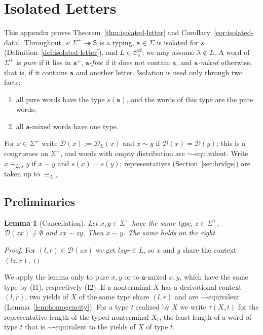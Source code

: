 \documentclass[11pt]{article}
\numberwithin{equation}{section}
\theoremstyle{plain}
\newtheorem{lemma}[theorem]{Lemma}
\theoremstyle{definition}
\theoremstyle{remark}
\theoremstyle{plain}
\newcommand{\cf}{\mathrm{cf}}
\newcommand{\Ccf}[1]{\mathcal C_{#1}^{\cf}}
\newcommand{\D}{\mathcal{D}}
\newcommand{\eps}{\lambda}
\begin{document}
\section{Isolated Letters}
\label{app:isolated}

This appendix proves Theorem~\ref{thm:isolated-letter} and
Corollary~\ref{cor:isolated-data}.  Throughout,
$s:\Sigma^+\twoheadrightarrow\mathsf S$ is a typing, $\mathtt a\in\Sigma$ is isolated
for $s$ (Definition~\ref{def:isolated-letter}), and $L\in\Ccf{s}$; we may
assume $\eps\notin L$.  A word of $\Sigma^+$ is \emph{pure} if it lies in
$\mathtt a^+$, \emph{$\mathtt a$-free} if it does not contain $\mathtt a$, and
\emph{$\mathtt a$-mixed} otherwise, that is, if it contains $\mathtt a$ and another
letter.  Isolation is used only through two facts:
\begin{enumerate}[label=\textup{(I\arabic*)},leftmargin=*]
\item all pure words have the type $s(\mathtt a)$, and the words of this type are
the pure words;
\item all $\mathtt a$-mixed words have one type.
\end{enumerate}
For $x\in\Sigma^+$ write $\D(x):=\D_L(x)$ and $x\sim y$ if
$\D(x)=\D(y)$; this is a congruence on $\Sigma^+$, and words with empty
distribution are $\sim$-equivalent.  Write $x\equiv_{L,s}y$ if
$x\sim y$ and $s(x)=s(y)$; representatives (Section~\ref{sec:bridge}) are taken up to $\equiv_{L,s}$.

\subsection{Preliminaries}

\begin{lemma}[Cancellation]
\label{lem:app-h-cancel}
Let $x,y\in\Sigma^+$ have the same type, $z\in\Sigma^+$, $\D(zx)\ne\emptyset$
and $zx\sim zy$.  Then $x\sim y$.  The same holds on the right.
\end{lemma}

\begin{proof}
For $(l,r)\in\D(zx)$ we get $lzyr\in L$, so $x$ and $y$ share the context
$(lz,r)$.
\end{proof}

We apply the lemma only to pure $x,y$ or to $\mathtt a$-mixed $x,y$, which have
the same type by (I1), respectively (I2).  If a nonterminal $X$ has a
derivational context $(l,r)$, two yields of $X$ of the same type share $(l,r)$
and are $\sim$-equivalent (Lemma~\ref{lem:homogeneity}).  For a type $t$
realized by $X$ we write $\tau(X,t)$ for the representative length of the typed
nonterminal $X_t$, the least length of a word of type $t$ that is
$\sim$-equivalent to the yields of $X$ of type $t$.
\end{document}
